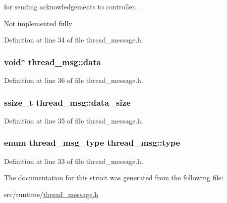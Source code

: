 for sending acknowledgements to controller. 

Not implemented fully 

Definition at line 34 of file thread\-\_\-message.\-h.

\hypertarget{structthread__msg_adbe60c1c6c0aca2e83f5e3e5bedb1b18}{
\subsubsection[{data}]{\setlength{\rightskip}{0pt plus 5cm}void$\ast$ thread\-\_\-msg\-::data}}\label{structthread__msg_adbe60c1c6c0aca2e83f5e3e5bedb1b18}


Definition at line 36 of file thread\-\_\-message.\-h.

\hypertarget{structthread__msg_a7f32cae0c8abf93abf07be5fb141530f}{
\subsubsection[{data\-\_\-size}]{\setlength{\rightskip}{0pt plus 5cm}ssize\-\_\-t thread\-\_\-msg\-::data\-\_\-size}}\label{structthread__msg_a7f32cae0c8abf93abf07be5fb141530f}


Definition at line 35 of file thread\-\_\-message.\-h.

\hypertarget{structthread__msg_a21b68a06c996049760fba8a1b148d215}{
\subsubsection[{type}]{\setlength{\rightskip}{0pt plus 5cm}enum {\bf thread\-\_\-msg\-\_\-type} thread\-\_\-msg\-::type}}\label{structthread__msg_a21b68a06c996049760fba8a1b148d215}


Definition at line 33 of file thread\-\_\-message.\-h.



The documentation for this struct was generated from the following file\-:\begin{DoxyCompactItemize}
\item 
src/runtime/\hyperlink{thread__message_8h}{thread\-\_\-message.\-h}\end{DoxyCompactItemize}
